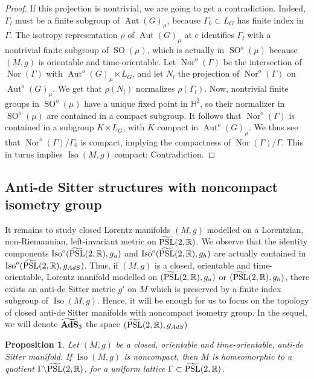 \documentclass[11pt]{article}
\newtheorem{prop}[theo]{Proposition}
\theoremstyle{definition}
\numberwithin{equation}{section}
\numberwithin{figure}{section}
\numberwithin{table}{section}
\DeclareMathOperator{\Aut}{Aut}
\DeclareMathOperator{\Iso}{Iso}
\DeclareMathOperator{\Nor}{Nor}
\DeclareMathOperator{\PSL}{PSL}
\DeclareMathOperator{\SO}{SO}
\newcommand*\RR{\mathbb{R}}
\let\oldtilde\tilde
\renewcommand*\tilde[1]{\mathchoice{\widetilde{#1}}{\widetilde{#1}}{\widetilde{#1}}{\oldtilde{#1}}}
\begin{document}
\begin{proof}
If this projection is nontrivial, we are going to get a contradiction. Indeed, $\Gamma_l$ must be a finite subgroup of $\Aut(G)_{\mu}$, because $\Gamma_0 \subset L_G$ has finite index in $\Gamma$. The isotropy representation $\rho$ of $\Aut(G)_{\mu}$ at $e$ identifies $\Gamma_l$ with a nontrivial finite subgroup of $\SO(\mu)$, which is actually in $\SO^o(\mu)$ because $(M,g)$ is orientable and time-orientable. Let $\Nor^o(\Gamma)$ be the intersection of $\Nor(\Gamma)$ with $\Aut^o(G)_{\mu} \ltimes L_G$, and let $N_l$ the projection of $\Nor^o(\Gamma)$ on $\Aut^o(G)_{\mu}$. We get that $\rho(N_l)$ normalizes $\rho(\Gamma_l)$. Now, nontrivial finite groups in $\SO^o(\mu)$ have a unique fixed point in ${\mathbb H}^2$, so their normalizer in $\SO^o(\mu)$ are contained in a compact subgroup. It follows that $\Nor^o(\Gamma)$ is contained in a subgroup $K \ltimes L_G$, with $K$ compact in $\Aut^o(G)_{\mu}$. We thus see that $\Nor^o(\Gamma)/\Gamma_0$ is compact, implying the compactness of $\Nor(\Gamma)/ \Gamma$. This in turns implies $\Iso(M,g)$ compact: Contradiction.
\end{proof}

\subsection{Anti-de Sitter structures with noncompact isometry group}

It remains to study closed Lorentz manifolds $(M,g)$ modelled on a Lorentzian, non-Riemannian, left-invariant metric on $\tilde{\PSL}(2,\RR)$. We observe that the identity components $\Iso^o(\tilde{\PSL}(2,\RR),g_u)$ and $\Iso^o(\tilde{\PSL}(2,\RR),g_h)$ are actually contained in $\Iso^o(\tilde{\PSL}(2,\RR),g_{AdS})$. Thus, if $(M,g)$ is a closed, orientable and time-orientable, Lorentz manifold modelled on $(\tilde{\PSL}(2,\RR),g_u)$ or $(\tilde{\PSL}(2,\RR),g_h)$, there exists an anti-de Sitter metric $g'$ on $M$ which is preserved by a finite index subgroup of $\Iso(M,g)$. Hence, it will be enough for us to focus on the topology of closed anti-de Sitter manifolds with noncompact isometry group. In the sequel, we will denote $\tilde{\bf AdS}_3$ the space $(\tilde{\PSL}(2,\RR),g_{AdS})$

\begin{prop}\label{prop.topologieads}
Let $(M,g)$ be a closed, orientable and time-orientable, anti-de Sitter manifold. If $\Iso(M,g)$ is noncompact, then $M$ is homeomorphic to a quotient $\Gamma \backslash \tilde{\PSL}(2,\RR)$, for a uniform lattice $\Gamma \subset \tilde{\PSL}(2,\RR)$.
\end{prop}
\end{document}
